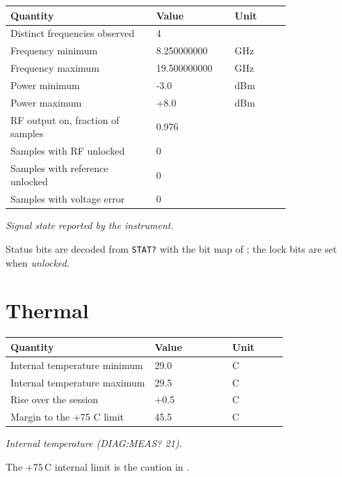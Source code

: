 \documentclass[11pt]{article}
\begin{document}
\begin{center}
\begin{tabular}{@{}p{0.52\linewidth}p{0.28\linewidth}l@{}}
\toprule
\textbf{Quantity} & \textbf{Value} & \textbf{Unit} \\
\midrule
Distinct frequencies observed & 4 &  \\
Frequency minimum & 8.250000000 & GHz \\
Frequency maximum & 19.500000000 & GHz \\
Power minimum & -3.0 & dBm \\
Power maximum & +8.0 & dBm \\
RF output on, fraction of samples & 0.976 &  \\
Samples with RF unlocked & 0 &  \\
Samples with reference unlocked & 0 &  \\
Samples with voltage error & 0 &  \\
\bottomrule
\end{tabular}

\emph{Signal state reported by the instrument.}
\end{center}

Status bits are decoded from \texttt{STAT?} with the bit map of
\cite[Table 5]{nicomms}; the lock bits are set when \emph{unlocked}.

\section{Thermal}

\begin{center}
\begin{tabular}{@{}p{0.52\linewidth}p{0.28\linewidth}l@{}}
\toprule
\textbf{Quantity} & \textbf{Value} & \textbf{Unit} \\
\midrule
Internal temperature minimum & 29.0 & \textdegree{}C \\
Internal temperature maximum & 29.5 & \textdegree{}C \\
Rise over the session & +0.5 & \textdegree{}C \\
Margin to the +75 \textdegree{}C limit & 45.5 & \textdegree{}C \\
\bottomrule
\end{tabular}

\emph{Internal temperature (DIAG:MEAS? 21).}
\end{center}

The +75\,\textdegree{}C internal limit is the caution in \cite{niguide}.
\end{document}

